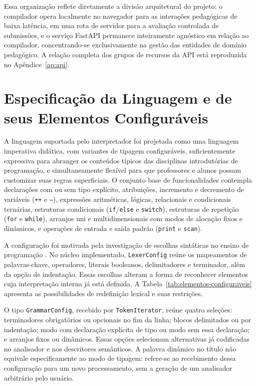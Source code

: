 Essa organização reflete diretamente a divisão arquitetural do projeto: o compilador opera localmente no navegador para as interações pedagógicas de baixa latência, em uma rota de servidor para a avaliação controlada de submissões, e o serviço FastAPI permanece inteiramente agnóstico em relação ao compilador, concentrando-se exclusivamente na gestão das entidades de domínio pedagógico. A relação completa dos grupos de recursos da API está reproduzida no Apêndice~\ref{ap:api}.

\section{Especificação da Linguagem e de seus Elementos Configuráveis}
\label{sec:especificacao-linguagem}

A linguagem suportada pelo interpretador foi projetada como uma linguagem imperativa didática, com variantes de tipagem configuráveis, suficientemente expressiva para abranger os conteúdos típicos das disciplinas introdutórias de programação, e simultaneamente flexível para que professores e alunos possam customizar suas regras superficiais. O conjunto base de funcionalidades contempla declarações com ou sem tipo explícito, atribuições, incremento e decremento de variáveis (\texttt{++} e \texttt{--}), expressões aritméticas, lógicas, relacionais e condicionais ternárias, estruturas condicionais (\texttt{if}/\texttt{else} e \texttt{switch}), estruturas de repetição (\texttt{for} e \texttt{while}), arranjos uni e multidimensionais com modos de alocação fixos e dinâmicos, e operações de entrada e saída padrão (\texttt{print} e \texttt{scan}).

A configuração foi motivada pela investigação de escolhas sintáticas no ensino de programação \cite{stefik2013}. No núcleo implementado, \texttt{LexerConfig} reúne os mapeamentos de palavras-chave, operadores, literais booleanos, delimitadores e terminador, além da opção de indentação. Essas escolhas alteram a forma de reconhecer elementos cuja interpretação interna já está definida. A Tabela~\ref{tab:elementos-configuraveis} apresenta as possibilidades de redefinição lexical e suas restrições.

O tipo \texttt{GrammarConfig}, recebido por \texttt{TokenIterator}, reúne quatro seleções: terminadores obrigatórios ou opcionais no fim da linha; blocos delimitados ou por indentação; modo com declaração explícita de tipo ou modo sem essa declaração; e arranjos fixos ou dinâmicos. Essas opções selecionam alternativas já codificadas no analisador e nos descritores semânticos. A palavra dinâmico no título não equivale especificamente ao modo de tipagem: refere-se ao recebimento dessa configuração para um novo processamento, sem a geração de um analisador arbitrário pelo usuário.

